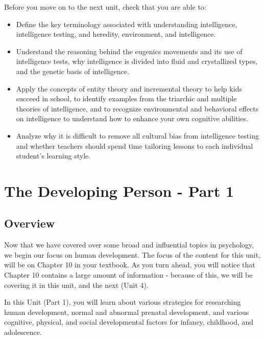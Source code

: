 \documentclass[
]{book}
\providecommand{\tightlist}{%
  \setlength{\itemsep}{0pt}\setlength{\parskip}{0pt}}
\begin{document}
\begin{progress}
Before you move on to the next unit, check that you are able to:

\begin{itemize}
\tightlist
\item
  Define the key terminology associated with understanding intelligence, intelligence testing, and heredity, environment, and intelligence.\\
\item
  Understand the reasoning behind the eugenics movements and its use of intelligence tests, why intelligence is divided into fluid and crystallized types, and the genetic basis of intelligence.\\
\item
  Apply the concepts of entity theory and incremental theory to help kids succeed in school, to identify examples from the triarchic and multiple theories of intelligence, and to recognize environmental and behavioral effects on intelligence to understand how to enhance your own cognitive abilities.\\
\item
  Analyze why it is difficult to remove all cultural bias from intelligence testing and whether teachers should spend time tailoring lessons to each individual student's learning style.
\end{itemize}
\end{progress}

\hypertarget{the-developing-person---part-1}{%
\chapter{The Developing Person - Part 1}\label{the-developing-person---part-1}}

\hypertarget{overview-2}{%
\section*{Overview}\label{overview-2}}

Now that we have covered over some broad and influential topics in psychology, we begin our focus on human development. The focus of the content for this unit, will be on Chapter 10 in your textbook. As you turn ahead, you will notice that Chapter 10 contains a large amount of information - because of this, we will be covering it in this unit, and the next (Unit 4).

In this Unit (Part 1), you will learn about various strategies for researching human development, normal and abnormal prenatal development, and various cognitive, physical, and social developmental factors for infancy, childhood, and adolescence.
\end{document}
